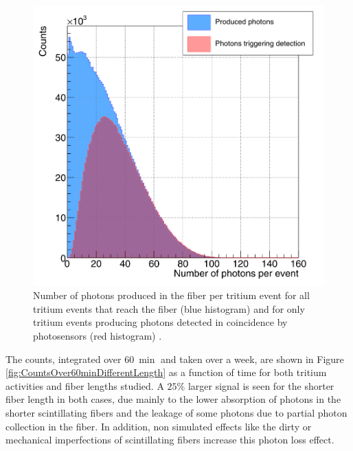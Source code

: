 \begin{figure}[h]
\centering
\includegraphics[scale=0.3]{Figures/8SimulationsResults/81TRITIUMDesign/813Length/CollectionPhotonsInFibers.png}
\caption{Number of photons produced in the fiber per tritium event for all tritium events that reach the fiber (blue histogram) and for only tritium events producing photons detected in coincidence by photosensors (red histogram) \cite{SimulationPaperCarlos}.\label{fig:PhotonsFibersYesNoPhotosensors}}
\end{figure}


The counts, integrated over $60~\min$ and taken over a week, are shown in Figure \ref{fig:CountsOver60minDifferentLength} as a function of time for both tritium activities and fiber lengths studied. A $25\%$ larger signal is seen for the shorter fiber length in both cases, due mainly to the lower absorption of photons in the shorter scintillating fibers and the leakage of some photons due to partial photon collection in the fiber. In addition, non simulated effects like the dirty or mechanical imperfections of scintillating fibers increase this photon loss effect.

